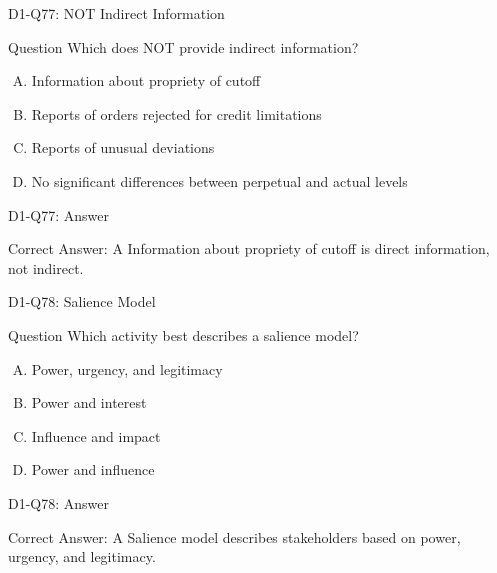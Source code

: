 \documentclass{beamer}
\begin{document}
	\begin{frame}{D1-Q77: NOT Indirect Information}
		\begin{block}{Question}
			Which does NOT provide indirect information?
		\end{block}
		\begin{enumerate}[(A)]
			\item Information about propriety of cutoff
			\item Reports of orders rejected for credit limitations
			\item Reports of unusual deviations
			\item No significant differences between perpetual and actual levels
		\end{enumerate}
	\end{frame}
	\begin{frame}{D1-Q77: Answer}
		\begin{block}{Correct Answer: A}
			Information about propriety of cutoff is direct information, not indirect.
		\end{block}
	\end{frame}
	
	\begin{frame}{D1-Q78: Salience Model}
		\begin{block}{Question}
			Which activity best describes a salience model?
		\end{block}
		\begin{enumerate}[(A)]
			\item Power, urgency, and legitimacy
			\item Power and interest
			\item Influence and impact
			\item Power and influence
		\end{enumerate}
	\end{frame}
	\begin{frame}{D1-Q78: Answer}
		\begin{block}{Correct Answer: A}
			Salience model describes stakeholders based on power, urgency, and legitimacy.
		\end{block}
	\end{frame}
	
\end{document}
